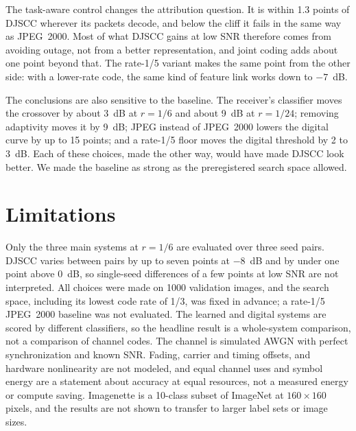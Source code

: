 \documentclass[conference]{IEEEtran}
\begin{document}
The task-aware control changes the attribution question. It is within 1.3 points of DJSCC wherever its packets decode, and below the cliff it fails in the same way as JPEG~2000. Most of what DJSCC gains at low SNR therefore comes from avoiding outage, not from a better representation, and joint coding adds about one point beyond that. The rate-1/5 variant makes the same point from the other side: with a lower-rate code, the same kind of feature link works down to $-7$~dB.

The conclusions are also sensitive to the baseline. The receiver's classifier moves the crossover by about 3~dB at $r=1/6$ and about 9~dB at $r=1/24$; removing adaptivity moves it by 9~dB; JPEG instead of JPEG~2000 lowers the digital curve by up to 15 points; and a rate-1/5 floor moves the digital threshold by 2 to 3~dB. Each of these choices, made the other way, would have made DJSCC look better. We made the baseline as strong as the preregistered search space allowed.

\section{Limitations}
Only the three main systems at $r=1/6$ are evaluated over three seed pairs. DJSCC varies between pairs by up to seven points at $-8$~dB and by under one point above 0~dB, so single-seed differences of a few points at low SNR are not interpreted. All choices were made on 1000 validation images, and the search space, including its lowest code rate of 1/3, was fixed in advance; a rate-1/5 JPEG~2000 baseline was not evaluated. The learned and digital systems are scored by different classifiers, so the headline result is a whole-system comparison, not a comparison of channel codes. The channel is simulated AWGN with perfect synchronization and known SNR. Fading, carrier and timing offsets, and hardware nonlinearity are not modeled, and equal channel uses and symbol energy are a statement about accuracy at equal resources, not a measured energy or compute saving. Imagenette is a 10-class subset of ImageNet at $160\times160$ pixels, and the results are not shown to transfer to larger label sets or image sizes.
\end{document}
